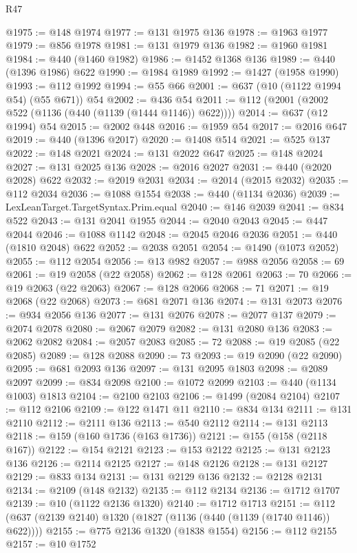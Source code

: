 \begin{lexlean}{R47}
\begin{coremodule}
@1975 := @148 @1974
@1977 := @131 @1975 @136
@1978 := @1963 @1977
@1979 := @856 @1978
@1981 := @131 @1979 @136
@1982 := @1960 @1981
@1984 := @440 (@1460 @1982)
@1986 := @1452 @1368 @136
@1989 := @440 (@1396 @1986) @622
@1990 := @1984 @1989
@1992 := @1427 (@1958 @1990)
@1993 := @112 @1992
@1994 := @55 @66
@2001 := @637 (@10 (@1122 @1994 @54) (@55 @671)) @54
@2002 := @436 @54
@2011 := @112 (@2001 (@2002 @522 (@1136 (@440 (@1139 (@1444 @1146)) @622))))
@2014 := @637 (@12 @1994) @54
@2015 := @2002 @448
@2016 := @1959 @54
@2017 := @2016 @647
@2019 := @440 (@1396 @2017)
@2020 := @1408 @514
@2021 := @525 @137
@2022 := @148 @2021
@2024 := @131 @2022 @647
@2025 := @148 @2024
@2027 := @131 @2025 @136
@2028 := @2016 @2027
@2031 := @440 (@2020 @2028) @622
@2032 := @2019 @2031
@2034 := @2014 (@2015 @2032)
@2035 := @112 @2034
@2036 := @1088 @1554
@2038 := @440 (@1134 @2036)
@2039 := LexLeanTarget.TargetSyntax.Prim.equal
@2040 := @146 @2039
@2041 := @834 @522
@2043 := @131 @2041 @1955
@2044 := @2040 @2043
@2045 := @447 @2044
@2046 := @1088 @1142
@2048 := @2045 @2046 @2036
@2051 := @440 (@1810 @2048) @622
@2052 := @2038 @2051
@2054 := @1490 (@1073 @2052)
@2055 := @112 @2054
@2056 := @13 @982
@2057 := @988 @2056
@2058 := 69
@2061 := @19 @2058 (@22 @2058)
@2062 := @128 @2061
@2063 := 70
@2066 := @19 @2063 (@22 @2063)
@2067 := @128 @2066
@2068 := 71
@2071 := @19 @2068 (@22 @2068)
@2073 := @681 @2071 @136
@2074 := @131 @2073
@2076 := @934 @2056 @136
@2077 := @131 @2076
@2078 := @2077 @137
@2079 := @2074 @2078
@2080 := @2067 @2079
@2082 := @131 @2080 @136
@2083 := @2062 @2082
@2084 := @2057 @2083
@2085 := 72
@2088 := @19 @2085 (@22 @2085)
@2089 := @128 @2088
@2090 := 73
@2093 := @19 @2090 (@22 @2090)
@2095 := @681 @2093 @136
@2097 := @131 @2095 @1803
@2098 := @2089 @2097
@2099 := @834 @2098
@2100 := @1072 @2099
@2103 := @440 (@1134 @1003) @1813
@2104 := @2100 @2103
@2106 := @1499 (@2084 @2104)
@2107 := @112 @2106
@2109 := @122 @1471 @11
@2110 := @834 @134
@2111 := @131 @2110
@2112 := @2111 @136
@2113 := @540 @2112
@2114 := @131 @2113
@2118 := @159 (@160 @1736 (@163 @1736))
@2121 := @155 (@158 (@2118 @167))
@2122 := @154 @2121
@2123 := @153 @2122
@2125 := @131 @2123 @136
@2126 := @2114 @2125
@2127 := @148 @2126
@2128 := @131 @2127
@2129 := @833 @134
@2131 := @131 @2129 @136
@2132 := @2128 @2131
@2134 := @2109 (@148 @2132)
@2135 := @112 @2134
@2136 := @1712 @1707
@2139 := @10 (@1122 @2136 @1320)
@2140 := @1712 @1713
@2151 := @112 (@637 (@2139 @2140) @1320 (@1827 (@1136 (@440 (@1139 (@1740 @1146)) @622))))
@2155 := @775 @2136 @1320 (@1838 @1554)
@2156 := @112 @2155
@2157 := @10 @1752

\end{coremodule}
\end{lexlean}
